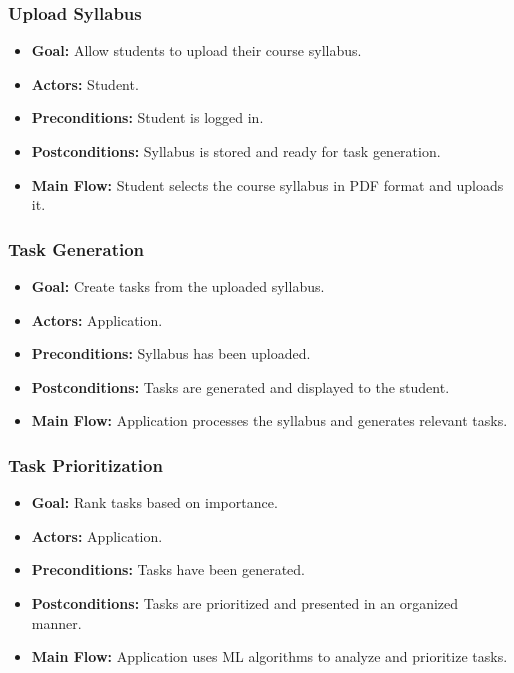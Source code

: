 \documentclass[12pt]{article}
\begin{document}
\subsubsection{Upload Syllabus}
\begin{itemize}
    \item \textbf{Goal:} Allow students to upload their course syllabus.
    \item \textbf{Actors:} Student.
    \item \textbf{Preconditions:} Student is logged in.
    \item \textbf{Postconditions:} Syllabus is stored and ready for task generation.
    \item \textbf{Main Flow:} Student selects the course syllabus in PDF format and uploads it.
\end{itemize}

\subsubsection{Task Generation}
\begin{itemize}
    \item \textbf{Goal:} Create tasks from the uploaded syllabus.
    \item \textbf{Actors:} Application.
    \item \textbf{Preconditions:} Syllabus has been uploaded.
    \item \textbf{Postconditions:} Tasks are generated and displayed to the student.
    \item \textbf{Main Flow:} Application processes the syllabus and generates relevant tasks.
\end{itemize}

\subsubsection{Task Prioritization}
\begin{itemize}
    \item \textbf{Goal:} Rank tasks based on importance.
    \item \textbf{Actors:} Application.
    \item \textbf{Preconditions:} Tasks have been generated.
    \item \textbf{Postconditions:} Tasks are prioritized and presented in an organized manner.
    \item \textbf{Main Flow:} Application uses ML algorithms to analyze and prioritize tasks.
\end{itemize}
\end{document}
